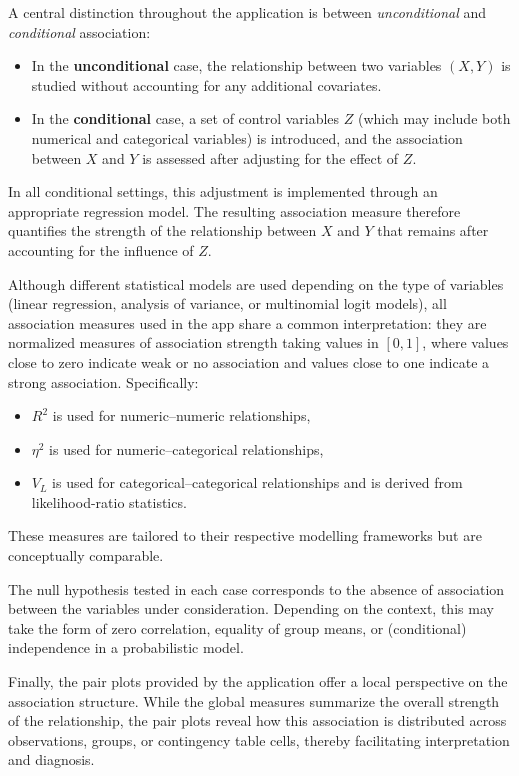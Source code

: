 \documentclass[11pt,a4paper]{article}
\begin{document}
A central distinction throughout the application is between \emph{unconditional} and \emph{conditional} association:
\begin{itemize}
\item In the \textbf{unconditional} case, the relationship between two variables $(X,Y)$ is studied without accounting for any additional covariates.
\item In the \textbf{conditional} case, a set of control variables $Z$ (which may include both numerical and categorical variables) is introduced, and the association between $X$ and $Y$ is assessed after adjusting for the effect of $Z$.
\end{itemize}

In all conditional settings, this adjustment is implemented through an appropriate regression model. The resulting association measure therefore quantifies the strength of the relationship between $X$ and $Y$ that remains after accounting for the influence of $Z$.

\medskip

Although different statistical models are used depending on the type of variables (linear regression, analysis of variance, or multinomial logit models), all association measures used in the app share a common interpretation: they are normalized measures of association strength taking values in $[0,1]$, where values close to zero indicate weak or no association and values close to one indicate a strong association. Specifically:
\begin{itemize}
\item $R^2$ is used for numeric--numeric relationships,
\item $\eta^2$ is used for numeric--categorical relationships,
\item $V_L$ is used for categorical--categorical relationships and is derived from likelihood-ratio statistics.
\end{itemize}
These measures are tailored to their respective modelling frameworks but are conceptually comparable.

\medskip

The null hypothesis tested in each case corresponds to the absence of association between the variables under consideration. Depending on the context, this may take the form of zero correlation, equality of group means, or (conditional) independence in a probabilistic model.

\medskip

Finally, the pair plots provided by the application offer a local perspective on the association structure. While the global measures summarize the overall strength of the relationship, the pair plots reveal how this association is distributed across observations, groups, or contingency table cells, thereby facilitating interpretation and diagnosis.
\end{document}
